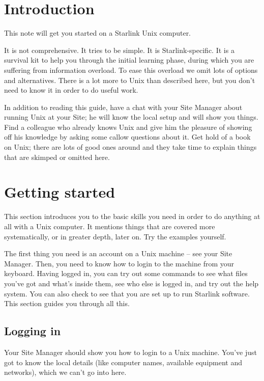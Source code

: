 \documentclass[twoside,11pt,nolof]{starlink}
\begin{document}
\scfrontmatter

\section{Introduction}

This note will get you started on a Starlink Unix computer.

It is not comprehensive.
It tries to be simple.
It is Starlink-specific.
It is a survival kit to help you through the initial learning phase, during
which you are suffering from information overload.
To ease this overload we omit lots of options and alternatives.
There is a lot more to Unix than described here, but you don't need to
know it in order to do useful work.

In addition to reading this guide, have a chat with your Site Manager about
running Unix at your Site; he will know the local setup and will show
you things.
Find a colleague who already knows Unix and give him the pleasure of showing
off his knowledge by asking some callow questions about it.
Get hold of a book on Unix; there are lots of good ones around and
they take time to explain things that are skimped or omitted here.

\newpage

\section{Getting started}

This section introduces you to the basic skills you need in order to do anything
at all with a Unix computer.
It mentions things that are covered more systematically, or in greater depth,
later on.
Try the examples yourself.

The first thing you need is an account on a Unix machine -- see your Site
Manager.
Then, you need to know how to login to the machine from your keyboard.
Having logged in, you can try out some commands to see what files you've got
and what's inside them, see who else is logged in, and try out the help system.
You can also check to see that you are set up to run Starlink software.
This section guides you through all this.

\subsection{Logging in}

Your Site Manager should show you how to login to a Unix machine.
You've just got to know the local details (like computer names, available
equipment and networks), which we can't go into here.
\end{document}
